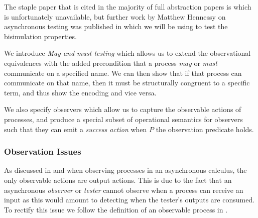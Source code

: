The staple paper that is cited in the majority of full abstraction papers is \citep{Hennessy1988AlgebraicTO} which is unfortunately unavailable, but further work by Matthew Hennessy on asynchronous testing was published in \citep{10.1007/978-3-540-49382-2_9} which we will be using to test the bisimulation properties. 

We introduce \textit{May and must testing} which allows us to extend the observational equivalences with the added precondition that a process \textit{may} or \textit{must} communicate on a specified name. We can then show that if that process can communicate on that name, then it must be structurally congruent to a specific term, and thus show the encoding and vice versa.

We also specify observers which allow us to capture the observable actions of processes, and produce a special subset of operational semantics for observers such that they can emit a \textit{success action} when $P$ the observation predicate holds. 

\subsubsection{Observation Issues}
As discussed in \citep{10.1007/978-3-540-49382-2_9} and \citep{castellan2019two} when observing processes in an asynchronous calculus, the only observable actions are output actions. This is due to the fact that an asynchronous \textit{observer} or \textit{tester} cannot observe when a process can receive an input as this would amount to detecting when the tester's outputs are consumed. To rectify this issue we follow the definition of an observable process in \citep{demangeon2011full}.







